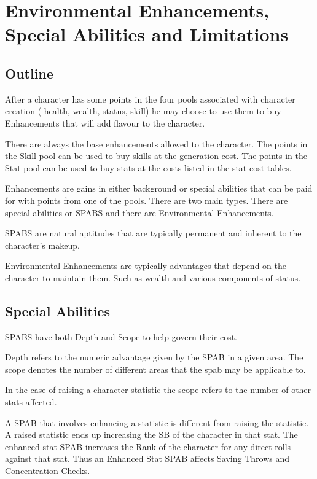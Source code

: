 \chapter{Environmental Enhancements, Special Abilities and Limitations}

\section{Outline}

After a character has some points in the four pools associated with 
character creation ( health, wealth, status, skill) he may choose to 
use them to buy Enhancements that will add flavour to the character. 

There are always the base enhancements allowed to the character. The
points in the Skill pool can be used to buy skills at the generation
cost. The points in the Stat pool can be used to buy stats at the costs
listed in the stat cost tables.

Enhancements are gains in either background or special abilities that 
can be paid for with points from one of the pools. There are two main 
types. There are special abilities or SPABS and there are 
Environmental Enhancements.  

SPABS are natural aptitudes that are typically permanent and inherent 
to the character's makeup.

Environmental Enhancements are typically advantages that depend on  the
character to maintain them. Such as wealth and various components of
status. 



\section{Special Abilities}

SPABS have both Depth and Scope to help govern their cost.

Depth refers to the numeric advantage given by the SPAB in a given 
area. The scope denotes the number of different areas that the spab 
may be applicable to. 

In the case of raising a character statistic the scope refers to the 
number of other stats affected.

A SPAB that involves enhancing a statistic is different from raising the
statistic. A raised statistic ends up increasing the SB of the character
in that stat. The enhanced stat SPAB increases the Rank of the character
for any direct rolls against that stat. Thus an Enhanced Stat SPAB
affects Saving Throws and Concentration Checks.

